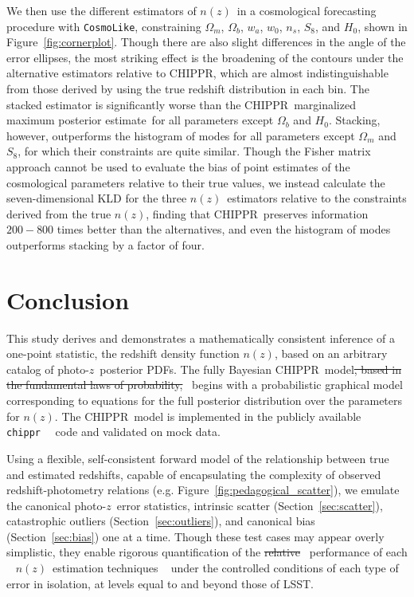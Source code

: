 \documentclass[iop]{emulateapj}
\newcommand{\todo}[3]{{\color{#2}\emph{#1}: #3}}
\newcommand{\aim}[1]{\todo{AIM}{red}{#1}}
\newcommand{\new}[2]{{\color{red}\sout{#1}}\ {\color{blue}{#2}}}%
\newcommand{\Sect}[1]{Section~\ref{#1}}
\newcommand{\Fig}[1]{Figure~\ref{#1}}
\newcommand{\project}[1]{\textsc{#1}}
\newcommand{\lsst}{\project{LSST}}
\newcommand{\Chippr}{\project{CHIPPR}}
\newcommand{\repo}[1]{\texttt{#1}}
\newcommand{\chippr}{\repo{chippr}}
\newcommand{\cosmolike}{\repo{CosmoLike}}
\newcommand{\pz}{photo-$z$}
\newcommand{\pzpdf}{\pz\ posterior PDF}
\newcommand{\nz}{$n(z)$}
\newcommand{\mmle}{marginalized maximum posterior estimate}
\begin{document}
{	%
	
	We then use the different estimators of \nz\ in a cosmological forecasting procedure with \cosmolike, constraining $\Omega_{m}$, $\Omega_{b}$, $w_{a}$, $w_{0}$, $n_{s}$, $S_{8}$, and $H_{0}$, shown in \Fig{fig:cornerplot}.
	Though there are also slight differences in the angle of the error ellipses, the most striking effect is the broadening of the contours under the alternative estimators relative to \Chippr, which are almost indistinguishable from those derived by using the true redshift distribution in each bin.
	The stacked estimator is significantly worse than the \Chippr\ \mmle\ for all parameters except $\Omega_{b}$ and $H_{0}$.
	Stacking, however, outperforms the histogram of modes for all parameters except $\Omega_{m}$ and $S_{8}$, for which their constraints are quite similar.
	Though the Fisher matrix approach cannot be used to evaluate the bias of point estimates of the cosmological parameters relative to their true values, we instead calculate the seven-dimensional KLD for the three \nz\ estimators relative to the constraints derived from the true \nz, finding that \Chippr\ preserves information $200-800$ times better than the alternatives, and even the histogram of modes outperforms stacking by a factor of four.
	
}

\section{Conclusion}
\label{sec:con}

This study derives and demonstrates a mathematically consistent inference of a one-point statistic, the redshift density function \nz, based on an arbitrary catalog of \pzpdf s.  
The fully Bayesian \Chippr\ model\new{, based in the fundamental laws of probability,}{} begins with a probabilistic graphical model corresponding to equations for the full posterior distribution over the parameters for \nz.  
The \Chippr\ model is implemented in the publicly available \chippr\ \new{}{prototype} code and validated on mock data.

Using a flexible, self-consistent forward model of the relationship between true and estimated redshifts, capable of encapsulating the complexity of observed redshift-photometry relations (e.g. \Fig{fig:pedagogical_scatter}), we emulate the canonical \pz\ error statistics, intrinsic scatter (\Sect{sec:scatter}), catastrophic outliers (\Sect{sec:outliers}), and canonical bias (\Sect{sec:bias}) one at a time.
Though these test cases may appear overly simplistic, they enable rigorous quantification of the \new{relative}{} performance of each \new{}{of two established} \nz\ estimation techniques \new{}{relative to \Chippr} under the controlled conditions of each type of error in isolation, at levels equal to and beyond those of \lsst.
\end{document}
